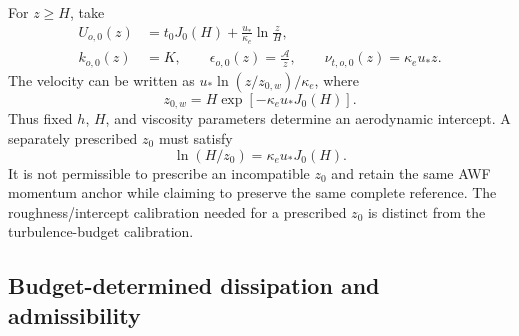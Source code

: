 \documentclass[11pt,a4paper]{article}
\numberwithin{equation}{section}
\begin{document}
For $z\geq H$, take
\begin{equation}
 \boxed{\begin{aligned}
 U_{o,0}(z)&=t_0J_0(H)+\frac{u_*}{\kappa_e}\ln\frac zH,\\
 k_{o,0}(z)&=K,\qquad
 \epsilon_{o,0}(z)=\frac{\mathcal A}{z},\qquad
 \nu_{t,o,0}(z)=\kappa_e u_*z.
 \end{aligned}}
 \label{ba:outer-profile}
\end{equation}
The velocity can be written as $u_*\ln(z/z_{0,w})/\kappa_e$, where
\begin{equation}
 \boxed{z_{0,w}=H\exp[-\kappa_e u_*J_0(H)].}
 \label{ba:aerodynamic-intercept}
\end{equation}
Thus fixed $h$, $H$, and viscosity parameters determine an aerodynamic
intercept. A separately prescribed $z_0$ must satisfy
\begin{equation}
 \ln(H/z_0)=\kappa_e u_*J_0(H).
 \label{ba:prescribed-z0}
\end{equation}
It is not permissible to prescribe an incompatible $z_0$ and retain the
same AWF momentum anchor while claiming to preserve the same complete
reference. The roughness/intercept calibration needed for a prescribed
$z_0$ is distinct from the turbulence-budget calibration.

\subsection{Budget-determined dissipation and admissibility}
\label{ba:cutoff}
\end{document}
